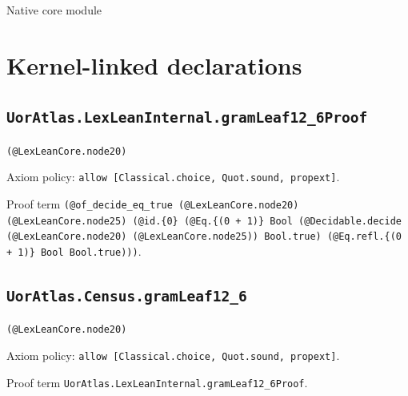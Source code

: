 \documentclass[11pt]{article}
\begin{document}
\begin{center}{\LARGE Native core module}\end{center}
\section*{Kernel-linked declarations}
\subsection*{\texttt{UorAtlas.LexLeanInternal.gramLeaf12\_6Proof}}
\noindent\texttt{(@LexLeanCore.node20)}\par
\noindent Axiom policy: \texttt{allow [Classical.choice, Quot.sound, propext]}.\par
\noindent Proof term \texttt{(@of\_decide\_eq\_true (@LexLeanCore.node20) (@LexLeanCore.node25) (@id.\{0\} (@Eq.\{(0 + 1)\} Bool (@Decidable.decide (@LexLeanCore.node20) (@LexLeanCore.node25)) Bool.true) (@Eq.refl.\{(0 + 1)\} Bool Bool.true)))}.\par
\subsection*{\texttt{UorAtlas.Census.gramLeaf12\_6}}
\noindent\texttt{(@LexLeanCore.node20)}\par
\noindent Axiom policy: \texttt{allow [Classical.choice, Quot.sound, propext]}.\par
\noindent Proof term \texttt{UorAtlas.LexLeanInternal.gramLeaf12\_6Proof}.\par
\end{document}
